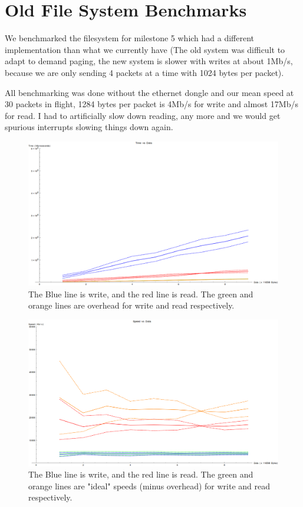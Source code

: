 \documentclass[12pt]{article}
\begin{document}
\section{Old File System Benchmarks}
We benchmarked the filesystem for milestone 5 which had a different implementation than what we currently have (The old system was difficult to adapt to demand paging, the new system is slower with writes at about 1Mb/s, because we are only sending 4 packets at a time with 1024 bytes per packet).

All benchmarking was done without the ethernet dongle and our mean speed at 30 packets in flight, 1284 bytes per packet is 4Mb/s for write and almost 17Mb/s for read. I had to artificially slow down reading, any more and we would get spurious interrupts slowing things down again.

\begin{figure}[htbp]
\centering
\includegraphics[scale=0.35]{benchmark_true_30_3}
\caption{The Blue line is write, and the red line is read.
The green and orange lines are overhead for write and read respectively.}
\end{figure}
\begin{figure}[htbp]
\centering
\includegraphics[scale=0.35]{benchmark_true_speed_30_3}
\caption{The Blue line is write, and the red line is read.
The green and orange lines are "ideal" speeds (minus overhead) for write and read respectively.}
\end{figure}
\end{document}
